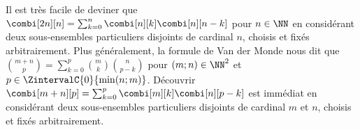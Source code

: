 

\begin{remark}
	Il est très facile de deviner que 
	$\combi[2n][n] = \sum_{k=0}^{n} \combi[n][k] \combi[n][n-k]$ pour $n \in \NN$
	en considérant deux sous-ensembles particuliers disjoints de cardinal $n$, choisis et fixés arbitrairement.
	Plus généralement,
	la formule de Van der Monde nous dit que
	$\binom{m + n}{p} = \sum_{k=0}^p \binom{m}{k} \binom{n}{p-k}$
	pour $(m ; n) \in \NN^2$ et $p \in \ZintervalC{0}{\min(n ; m)}$.
	Découvrir
	$\combi[m + n][p] = \sum_{k=0}^p \combi[m][k] \combi[n][p-k]$
	est immédiat en considérant deux sous-ensembles particuliers disjoints de cardinal $m$ et $n$, choisis et fixés arbitrairement.
\end{remark}




